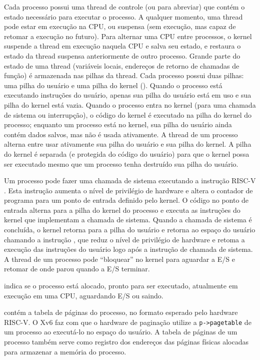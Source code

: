 Cada processo possui uma thread de controle (ou
para abreviar) que contém o estado necessário para executar o processo.
A qualquer momento, uma thread pode estar em execução na CPU,
ou suspensa (sem execução, mas capaz de retomar a execução
no futuro).
Para alternar uma CPU entre processos,
o kernel suspende a thread em execução naquela CPU
e salva seu estado, e restaura o estado da thread suspensa anteriormente de outro processo. 
Grande parte do estado de uma thread (variáveis locais, endereços de retorno de chamadas de função) é armazenada nas pilhas da thread.
Cada processo possui duas pilhas: uma pilha do usuário e uma pilha do kernel
().
Quando o processo está executando instruções do usuário, apenas sua pilha do usuário
está em uso e sua pilha do kernel está vazia.
Quando o processo entra no kernel (para uma chamada de sistema ou interrupção),
o código do kernel é executado na pilha do kernel do processo; enquanto
um processo está no kernel, sua pilha do usuário ainda contém dados
salvos, mas não é usada ativamente.
A thread de um processo alterna entre usar ativamente sua pilha do usuário
e sua pilha do kernel. A pilha do kernel é separada (e protegida do
código do usuário) para que o kernel
possa ser executado mesmo que um processo tenha destruído sua pilha do usuário.

Um processo pode fazer uma chamada de sistema executando a instrução RISC-V . Esta instrução aumenta o nível de privilégio de hardware e
altera o contador de programa para um ponto de entrada definido pelo kernel. O código
no ponto de entrada alterna para a pilha do kernel do processo e executa as instruções do kernel
que implementam a chamada de sistema. Quando a chamada de sistema
é concluída, o kernel retorna para a pilha do usuário e retorna ao
espaço do usuário chamando a instrução , que reduz
o nível de privilégio de hardware e retoma a execução das instruções do usuário
logo após a instrução de chamada de sistema. A thread de um processo pode
``bloquear'' no kernel para aguardar a E/S e retomar de onde parou
quando a E/S terminar.

indica se o processo está alocado, pronto
para ser executado, atualmente em execução em uma CPU, aguardando E/S ou saindo.

contém a tabela de páginas do processo, no formato
esperado pelo hardware RISC-V.
O Xv6 faz com que o hardware de paginação utilize a
\lstinline{p->pagetable}
de um processo ao executá-lo no espaço do usuário.
A tabela de páginas de um processo também serve como registro dos
endereços das páginas físicas alocadas para armazenar a
memória do processo.

